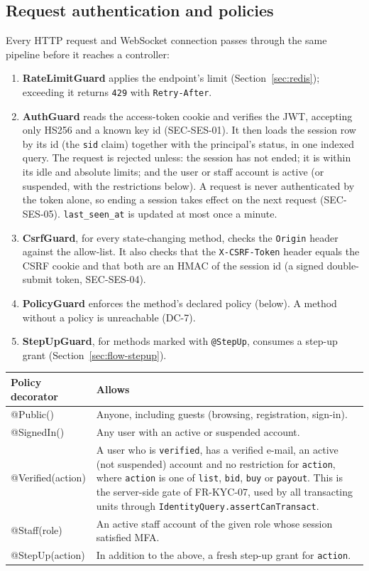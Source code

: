 \documentclass[11pt,a4paper]{article}
\newenvironment{dtable}[1]{\small\begin{longtable}{#1}}{\end{longtable}}
\begin{document}
\subsection{Request authentication and policies}
\label{sec:guards}
Every HTTP request and WebSocket connection passes through the same pipeline before it reaches a controller:
\begin{enumerate}[nosep]
  \item \textbf{RateLimitGuard} applies the endpoint's limit (Section~\ref{sec:redis}); exceeding it returns \texttt{429} with \texttt{Retry-After}.
  \item \textbf{AuthGuard} reads the access-token cookie and verifies the JWT, accepting only HS256 and a known key id (SEC-SES-01). It then loads the session row by its id (the \texttt{sid} claim) together with the principal's status, in one indexed query. The request is rejected unless: the session has not ended; it is within its idle and absolute limits; and the user or staff account is active (or suspended, with the restrictions below). A request is never authenticated by the token alone, so ending a session takes effect on the next request (SEC-SES-05). \texttt{last\_seen\_at} is updated at most once a minute.
  \item \textbf{CsrfGuard}, for every state-changing method, checks the \texttt{Origin} header against the allow-list. It also checks that the \texttt{X-CSRF-Token} header equals the CSRF cookie and that both are an HMAC of the session id (a signed double-submit token, SEC-SES-04).
  \item \textbf{PolicyGuard} enforces the method's declared policy (below). A method without a policy is unreachable (DC-7).
  \item \textbf{StepUpGuard}, for methods marked with \texttt{@StepUp}, consumes a step-up grant (Section~\ref{sec:flow-stepup}).
\end{enumerate}

\begin{dtable}{@{}>{\ttfamily}p{4.6cm}>{\raggedright\arraybackslash}p{10.6cm}@{}}
\toprule
\textnormal{\textbf{Policy decorator}} & \textbf{Allows} \\ \midrule \endhead
@Public() & Anyone, including guests (browsing, registration, sign-in). \\
@SignedIn() & Any user with an active or suspended account. \\
@Verified(action) & A user who is \texttt{verified}, has a verified e-mail, an active (not suspended) account and no restriction for \texttt{action}, where \texttt{action} is one of \texttt{list}, \texttt{bid}, \texttt{buy} or \texttt{payout}. This is the server-side gate of FR-KYC-07, used by all transacting units through \texttt{IdentityQuery.assertCanTransact}. \\
@Staff(role) & An active staff account of the given role whose session satisfied MFA. \\
@StepUp(action) & In addition to the above, a fresh step-up grant for \texttt{action}. \\
\bottomrule
\end{dtable}
\end{document}
